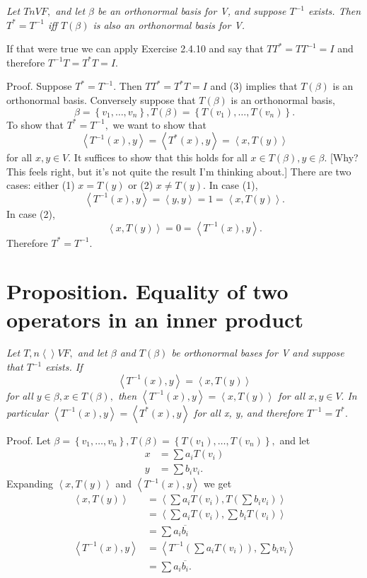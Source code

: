 \documentclass[12pt,english]{article}
\begin{document}
\emph{Let $TnVF,$ and let $\beta$ be an orthonormal basis for V,
and suppose $T^{-1}$ exists. Then $T^{*}=T^{-1}$ iff $T(\beta)$
is also an orthonormal basis for V.}

If that were true we can apply Exercise 2.4.10 and say that $TT^{*}=TT^{-1}=I$
and therefore $T^{-1}T=T^{*}T=I.$

Proof. Suppose $T^{*}=T^{-1}.$ Then $TT^{*}=T^{*}T=I$ and (3) implies
that $T(\beta)$ is an orthonormal basis. Conversely suppose that
$T(\beta)$ is an orthonormal basis,
\[
\beta=\left\{ v_{1},\ldots,v_{n}\right\} ,T(\beta)=\left\{ T(v_{1}),\ldots,T(v_{n})\right\} .
\]
 To show that $T^{*}=T^{-1},$ we want to show that
\[
\left\langle T^{-1}(x),y\right\rangle =\left\langle T^{*}(x),y\right\rangle =\left\langle x,T(y)\right\rangle
\]
for all $x,y\in V.$ It suffices to show that this holds for all $x\in T(\beta),y\in\beta.$
{[}Why? This feels right, but it's not quite the result I'm thinking
about.{]} There are two cases: either (1) $x=T(y)$ or (2) $x\neq T(y).$
In case (1),
\[
\left\langle T^{-1}(x),y\right\rangle =\left\langle y,y\right\rangle =1=\left\langle x,T(y)\right\rangle .
\]
 In case (2),
\[
\left\langle x,T(y)\right\rangle =0=\left\langle T^{-1}(x),y\right\rangle .
\]
 Therefore $T^{*}=T^{-1}.$

\section{Proposition. Equality of two operators in an inner product}

\emph{Let $T,n\left\langle \right\rangle VF,$ and let $\beta$ and
$T(\beta)$ be orthonormal bases for V and suppose that $T^{-1}$
exists. If
\[
\left\langle T^{-1}(x),y\right\rangle =\left\langle x,T(y)\right\rangle
\]
 for all $y\in\beta,x\in T(\beta),$ then $\left\langle T^{-1}(x),y\right\rangle =\left\langle x,T(y)\right\rangle $
for all $x,y\in V.$ In particular $\left\langle T^{-1}(x),y\right\rangle =\left\langle T^{*}(x),y\right\rangle $
for all x, y, and therefore $T^{-1}=T^{*}.$ }

Proof. Let $\beta=\left\{ v_{1},\ldots,v_{n}\right\} ,T(\beta)=\left\{ T(v_{1}),\ldots,T(v_{n})\right\} ,$
and let
\begin{align*}
x & =\sum a_{i}T(v_{i})\\
y & =\sum b_{i}v_{i}.
\end{align*}
Expanding $\left\langle x,T(y)\right\rangle $ and $\left\langle T^{-1}(x),y\right\rangle $
we get
\begin{align*}
\left\langle x,T(y)\right\rangle  & =\left\langle \sum a_{i}T(v_{i}),T\left(\sum b_{i}v_{i}\right)\right\rangle \\
 & =\left\langle \sum a_{i}T(v_{i}),\sum b_{i}T(v_{i})\right\rangle \\
 & =\sum a_{i}\overline{b_{i}}\\
\left\langle T^{-1}(x),y\right\rangle  & =\left\langle T^{-1}\left(\sum a_{i}T(v_{i})\right),\sum b_{i}v_{i}\right\rangle \\
 & =\sum a_{i}\overline{b_{i}}.
\end{align*}
\end{document}
